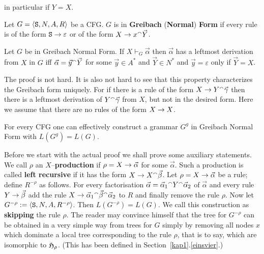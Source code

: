 in particular if $Y = X$.
\begin{defn}
Let $G = \langle \mbox{\tt S}, N, A, R\rangle$ be a CFG. $G$ is in 
\textbf{Grei\-bach} (\textbf{Nor\-mal}) \textbf{Form} if every 
rule is of the form $\mbox{\tt S} \rightarrow \varepsilon$ or of the form
$X \rightarrow x {^{\smallfrown}} \vec{Y}$.
\end{defn}
\begin{prop}
Let $G$ be in Greibach Normal Form. If $X \vdash_G \vec{\alpha}$ 
then $\vec{\alpha}$ has a leftmost derivation from $X$ in $G$ 
iff $\vec{\alpha} = \vec{y} {^{\smallfrown}} \vec{Y}$ for some 
$\vec{y} \in A^{\ast}$ and $\vec{Y} \in N^{\ast}$ and 
$\vec{y} = \varepsilon$ only if $\vec{Y} = X$.
\end{prop}
The proof is not hard.  It is also not hard
to see that this property characterizes the Greibach form
uniquely. For if there is a rule of the form
$X \rightarrow Y {^{\smallfrown}} \vec{\gamma}$ then there is a leftmost
derivation of $Y {^{\smallfrown}} \vec{\gamma}$ from $X$, but not in the
desired form. Here we assume that there are no rules of the form
$X \rightarrow X$.
\nocite{greibach:normal}
\begin{thm}[Greibach]
\label{greibach}
For every CFG one can effectively construct a
grammar $G^g$ in Greibach Normal Form with $L(G^g) = L(G)$.
\end{thm}
Before we start with the actual proof we shall prove some
auxiliary statements. We call $\rho$ an $X$--\textbf{production}
if $\rho = X \rightarrow \vec{\alpha}$
for some $\vec{\alpha}$. Such a production is called
\textbf{left recursive} if it has the form
$X \rightarrow X {^{\smallfrown}} \vec{\beta}$. Let $\rho = X \rightarrow \vec{\alpha}$
be a rule; define $R^{- \rho}$ as follows. For every
factorisation $\vec{\alpha} = \vec{\alpha}_1 \conc Y \conc %
\vec{\alpha}_2$ of $\vec{\alpha}$ and every rule $Y \rightarrow \vec{\beta}$
add the rule $X \pf \vec{\alpha}_1 \conc \vec{\beta} \conc %
\vec{\alpha}_2$ to $R$ and finally remove the rule $\rho$.
Now let $G^{-\rho} := \langle \mbox{\tt S}, N, A, R^{- \rho}\rangle$.
Then $L(G^{- \rho}) = L(G)$. We call this construction
as \textbf{skipping} the rule $\rho$.
The reader may convince himself that the tree for
$G^{-\rho}$ can be obtained in a very simple way from
trees for $G$ simply by removing all nodes $x$ which
dominate a local tree corresponding to the rule
$\rho$, that is to say, which are isomorphic to $\mathfrak{H}_{\rho}$.
(This has been defined in Section~\ref{kap1}.\ref{einsvier}.)
